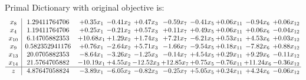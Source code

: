 \documentclass[9pt]{article}
\begin{document}
Primal Dictionary with original objective is:
\[\begin{array}{c| c c@{\hskip 2pt} c@{\hskip 2pt} c@{\hskip 2pt} c@{\hskip 2pt} c@{\hskip 2pt} c@{\hskip 2pt} c@{\hskip 2pt} c@{\hskip 2pt} }
 x_{8}   &  1.29411764706 & +  0.35 x_{1} & -0.41 x_{2} & +  0.47 x_{3} & -0.59 x_{7} & -0.41 x_{5} & +  0.06 x_{11} & -0.94 x_{6} & +  0.06 x_{12}\\
 x_{4}   &  1.19411764706 & +  0.25 x_{1} & -0.21 x_{2} & +  0.57 x_{3} & +  0.11 x_{7} & +  0.49 x_{5} & +  0.06 x_{11} & +  0.06 x_{6} & -0.04 x_{12}\\
 x_{10}   &  6.14705882353 & + 10.68 x_{1} & +  1.29 x_{2} & +  1.74 x_{3} & +  7.21 x_{7} & -6.21 x_{5} & +  0.53 x_{11} & +  4.53 x_{6} & +  0.03 x_{12}\\
 x_{9}   &  0.582352941176 & +  0.76 x_{1} & -2.64 x_{2} & +  5.71 x_{3} & -1.66 x_{7} & -9.54 x_{5} & +  0.18 x_{11} & -7.82 x_{6} & +  0.88 x_{12}\\
 x_{13}   &  20.0705882353 & -8.64 x_{1} & -3.26 x_{2} & -1.25 x_{3} & -0.14 x_{7} & +  4.54 x_{5} & +  0.29 x_{11} & +  9.29 x_{6} & -0.11 x_{12}\\
 x_{14}   &  21.5764705882 & -10.19 x_{1} & +  4.55 x_{2} & -12.52 x_{3} & + 12.85 x_{7} & +  0.75 x_{5} & -0.76 x_{11} & + 11.24 x_{6} & -0.36 x_{12}\\
\hline
z    &  4.87647058824 & -3.89 x_{1} & -6.05 x_{2} & -0.82 x_{3} & -0.25 x_{7} & +  5.05 x_{5} & +  0.24 x_{11} & +  4.24 x_{6} & -0.06 x_{12}\\
\end{array}\]
\end{document}
